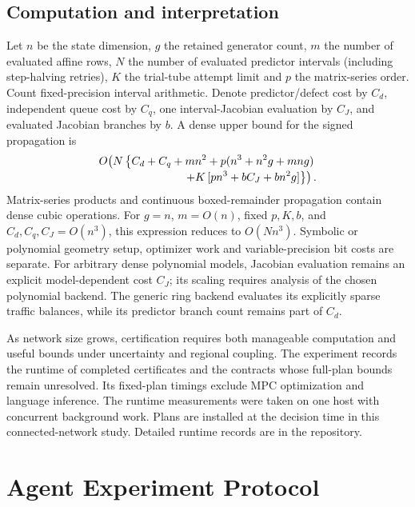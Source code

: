 \documentclass[journal,10pt]{IEEEtran}
\begin{document}
\subsection{Computation and interpretation}

Let $n$ be the state dimension, $g$ the retained generator count, $m$ the number
of evaluated affine rows, $N$ the number of evaluated predictor intervals
(including step-halving retries), $K$ the trial-tube
attempt limit and $p$ the matrix-series order. Count fixed-precision interval
arithmetic. Denote predictor/defect cost by $C_d$, independent queue cost by
$C_q$, one interval-Jacobian evaluation by $C_J$, and evaluated Jacobian
branches by $b$. A dense upper bound for the signed propagation is
\begin{equation}
 \begin{split}
 O\!\left(N\left\{C_d+C_q+mn^2
  +p(n^3+n^2g+mng)\right.\right.\\[-2pt]
 \left.\left.\hspace{12mm}+K\,[pn^3+bC_J+bn^2g]\right\}\right).
 \end{split}
 \label{eq:network-computation}
\end{equation}
Matrix-series products and continuous boxed-remainder propagation contain
dense cubic operations. For $g=n$, $m=O(n)$, fixed $p,K,b$, and
$C_d,C_q,C_J=O(n^3)$, this expression reduces to $O(Nn^3)$.
Symbolic or polynomial geometry setup, optimizer work and variable-precision
bit costs are separate. For arbitrary dense polynomial models, Jacobian
evaluation remains an explicit model-dependent cost $C_J$; its scaling
requires analysis of the chosen polynomial backend. The generic ring backend evaluates its explicitly sparse traffic
balances, while its predictor branch count remains part of $C_d$.

As network size grows, certification requires both manageable computation
and useful bounds under uncertainty and regional coupling. The experiment
records the runtime of completed certificates and the
contracts whose full-plan bounds remain unresolved.
Its fixed-plan timings exclude MPC optimization and language inference.
The runtime measurements were taken on one host with concurrent
background work. Plans are installed at the decision time in this
connected-network study. Detailed runtime records are in the repository.

\FloatBarrier

\FloatBarrier
\section{Agent Experiment Protocol}
\label{sec:supp-execution}
\end{document}
